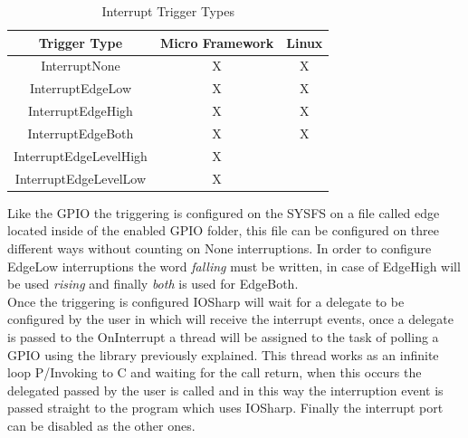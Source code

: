 \begin{table}[htb]
\begin{center}
\begin{tabular}{|c|c|c|}
\hline
{\bf Trigger Type} & {\bf Micro Framework} & {\bf Linux}  \\ \hline \hline
InterruptNone        & X    & X       \\ \hline
InterruptEdgeLow        & X    & X       \\ \hline
InterruptEdgeHigh        & X    & X       \\ \hline
InterruptEdgeBoth        & X    & X       \\ \hline
InterruptEdgeLevelHigh        & X    &        \\ \hline
InterruptEdgeLevelLow        & X    &        \\ \hline
\end{tabular}
\caption{Interrupt Trigger Types}
\label{T:Interrupt-Trigger-Types}
\end{center}
\end{table}

Like the GPIO the triggering is configured on the SYSFS on a file called edge located inside of the enabled GPIO folder, this file can be configured on three different ways without counting on None interruptions. In order to configure EdgeLow interruptions the word \textit{falling} must be written, in case of EdgeHigh will be used \textit{rising} and finally \textit{both} is used for EdgeBoth.
\\
Once the triggering is configured IOSharp will wait for a delegate to be configured by the user in which will receive the interrupt events, once a delegate is passed to the OnInterrupt a thread will be assigned to the task of polling a GPIO using the library previously explained. This thread works as an infinite loop P/Invoking to C and waiting for the call return, when this occurs the delegated passed by the user is called and in this way the interruption event is passed straight to the program which uses IOSharp. Finally the interrupt port can be disabled as the other ones.

